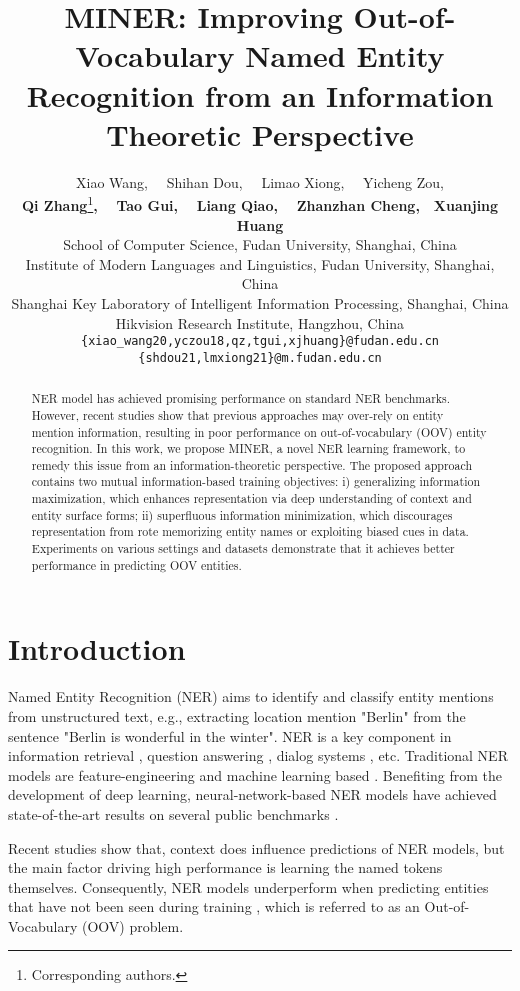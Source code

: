 \documentclass[11pt]{article}
\title{MINER: Improving Out-of-Vocabulary Named Entity Recognition from an Information Theoretic Perspective}
\author{{\normalsize
    Xiao Wang, \ \ Shihan Dou, \ \ Limao Xiong, \ \ Yicheng Zou, } \\ 
    {\normalsize \textbf{Qi Zhang}\thanks{{ }{ }Corresponding authors.}\textbf{,} \ \ \textbf{Tao Gui}\textbf{,} \ \
    \textbf{Liang Qiao}\textbf{,} \ \ \textbf{Zhanzhan Cheng}\textbf{,}\ \ \textbf{Xuanjing Huang} } \\
{ \normalsize School of Computer Science, Fudan University, Shanghai, China} \\
  { \normalsize Institute of Modern Languages and Linguistics, Fudan University, Shanghai, China} \\
  { \normalsize Shanghai Key Laboratory of Intelligent Information Processing, Shanghai, China} \\
  { \normalsize Hikvision Research Institute, Hangzhou, China} \\
  \texttt{\normalsize \{xiao\_wang20,yczou18,qz,tgui,xjhuang\}@fudan.edu.cn}\\
  \texttt{\normalsize \{shdou21,lmxiong21\}@m.fudan.edu.cn} \\
  }
\begin{document}
\maketitle

\begin{abstract}
NER model has achieved promising performance on standard NER benchmarks. However, recent studies show that previous approaches may over-rely on entity mention information, resulting in poor performance on out-of-vocabulary (OOV) entity recognition.  In this work, we propose MINER, a novel NER learning framework, to remedy this issue from an information-theoretic perspective. The proposed approach contains two mutual information-based training objectives: i) generalizing information maximization, which enhances representation via deep understanding of context and entity surface forms; ii) superfluous information minimization, which discourages representation from rote memorizing entity names or exploiting biased cues in data. Experiments on various settings and datasets demonstrate that it achieves better performance in predicting OOV entities.

\end{abstract}

\section{Introduction}

Named Entity Recognition (NER) aims to identify and classify entity mentions from unstructured text, e.g., extracting location mention "Berlin" from the sentence "Berlin is wonderful in the winter". NER is a key component in information retrieval \cite{tan-etal-2021-extracting}, question answering \cite{min-etal-2021-joint}, dialog systems \cite{wang-etal-2020-multi-domain}, etc. Traditional NER models are feature-engineering and machine learning based \cite{zhou2002named,takeuchi2002use,agerri2016robust}. Benefiting from the development of deep learning, neural-network-based NER models have achieved state-of-the-art results on several public benchmarks \cite{lample-etal-2016-neural,peters-etal-2018-deep,devlin2018bert,yamada-etal-2020-luke,yan-etal-2021-unified-generative}.

Recent studies \cite{lin-etal-2020-rigorous,agarwal2021interpretability} show that, context does influence predictions of NER models, but the main factor driving high performance is learning the named tokens themselves. Consequently, NER models underperform when predicting entities that have not been seen during training  \cite{fu2020rethinking,lin-etal-2020-rigorous}, which is referred to as an Out-of-Vocabulary (OOV) problem. 
\end{document}
